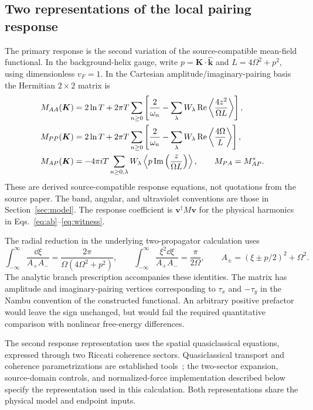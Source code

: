 \subsection{Two representations of the local pairing response}
The primary response is the second variation of the source-compatible mean-field functional. In the background-helix gauge, write $p=\bm K\cdot\widehat{\bm k}$ and $L=4\Omega^2+p^2$, using dimensionless $v_F=1$. In the Cartesian amplitude/imaginary-pairing basis the Hermitian $2\times2$ matrix is
\begin{align}\label{eq:kernelAA}
 M_{AA}(\bm K)&=2\ln T+2\pi T\sum_{n\ge0}\left[\frac{2}{\omega_n}
 -\sum_\lambda W_\lambda\operatorname{Re}\left\langle \frac{4z^2}{\Omega L}\right\rangle\right],\\
 M_{PP}(\bm K)&=2\ln T+2\pi T\sum_{n\ge0}\left[\frac{2}{\omega_n}
 -\sum_\lambda W_\lambda\operatorname{Re}\left\langle \frac{4\Omega}{L}\right\rangle\right],\label{eq:kernelPP}\\
 M_{AP}(\bm K)&=-4\pi iT\sum_{n\ge0,\lambda}W_\lambda
 \left\langle p\operatorname{Im}\left(\frac{z}{\Omega L}\right)\right\rangle,
 \qquad M_{PA}=M_{AP}^*.\label{eq:kernelAP}
\end{align}
These are derived source-compatible response equations, not quotations from the source paper. The band, angular, and ultraviolet conventions are those in Section~\ref{sec:model}. The response coefficient is $\bm v^\dagger M\bm v$ for the physical harmonics in Eqs.~\eqref{eq:ab}--\eqref{eq:witness}.

The radial reduction in the underlying two-propagator calculation uses
\begin{equation}\label{eq:radial}
 \int_{-\infty}^{\infty}\frac{\dd\xi}{A_+A_-}
 =\frac{2\pi}{\Omega(4\Omega^2+p^2)},\qquad
 \int_{-\infty}^{\infty}\frac{\xi^2\dd\xi}{A_+A_-}
 =\frac{\pi}{2\Omega},\qquad
 A_\pm=(\xi\pm p/2)^2+\Omega^2.
\end{equation}
The analytic branch prescription accompanies these identities. The matrix has amplitude and imaginary-pairing vertices corresponding to $\tau_x$ and $-\tau_y$ in the Nambu convention of the constructed functional. An arbitrary positive prefactor would leave the sign unchanged, but would fail the required quantitative comparison with nonlinear free-energy differences.

The second response representation uses the spatial quasiclassical equations, expressed through two Riccati coherence sectors. Quasiclassical transport and coherence parametrizations are established tools~\cite{Eilenberger1968,Eschrig2000}; the two-sector expansion, source-domain controls, and normalized-force implementation described below specify the representation used in this calculation. Both representations share the physical model and endpoint inputs.

